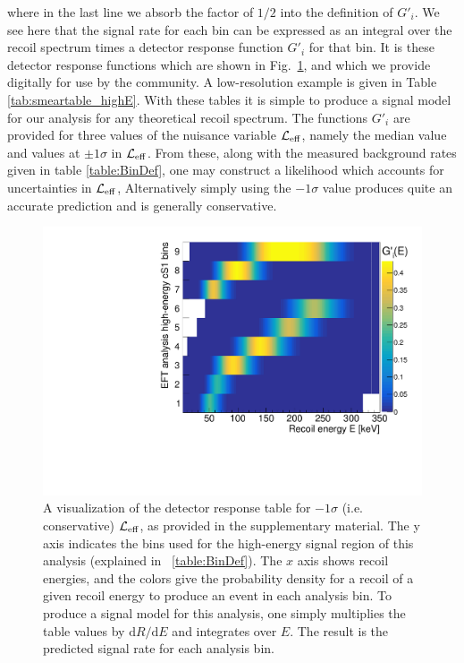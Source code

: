%
where in the last line we absorb the factor of $1/2$ into the definition of $G'_i$. We see here that the signal rate for each bin can be expressed as an integral over the recoil spectrum times a detector response function $G'_i$ for that bin. It is these detector response functions which are shown in Fig.~\ref{fig:smeartable_highE}, and which we provide digitally for use by the community. A low-resolution example is given in Table \ref{tab:smeartable_highE}. With these tables it is simple to produce a signal model for our analysis for any theoretical recoil spectrum. The functions $G'_i$ are provided for three values of the nuisance variable $\mathcal{L}_{\mathrm{eff}}$, namely the median value and values at $\pm 1 \sigma$ in $\mathcal{L}_{\mathrm{eff}}$. From these, along with the measured background rates given in table \ref{table:BinDef}, one may construct a likelihood which accounts for uncertainties in $\mathcal{L}_{\mathrm{eff}}$, Alternatively simply using the $-1\sigma$ value produces quite an accurate prediction and is generally conservative.

\begin{figure}
\centerline{\includegraphics[width=1.\linewidth]{Figures/smeartable_highE}}
\caption{A visualization of the detector response table for $-1\sigma$ (i.e. conservative) $\mathcal{L}_{\mathrm{eff}}$, as provided in the supplementary material. The y axis indicates the bins used for the high-energy signal region of this analysis (explained in ~\ref{table:BinDef}). The $x$ axis shows recoil energies, and the colors give the probability density for a recoil of a given recoil energy to produce an event in each analysis bin. To produce a signal model for this analysis, one simply multiplies the table values by $\mathrm{d}R/\mathrm{d}E$ and integrates over $E$. The result is the predicted signal rate for each analysis bin.}
\label{fig:smeartable_highE}
\end{figure}  

